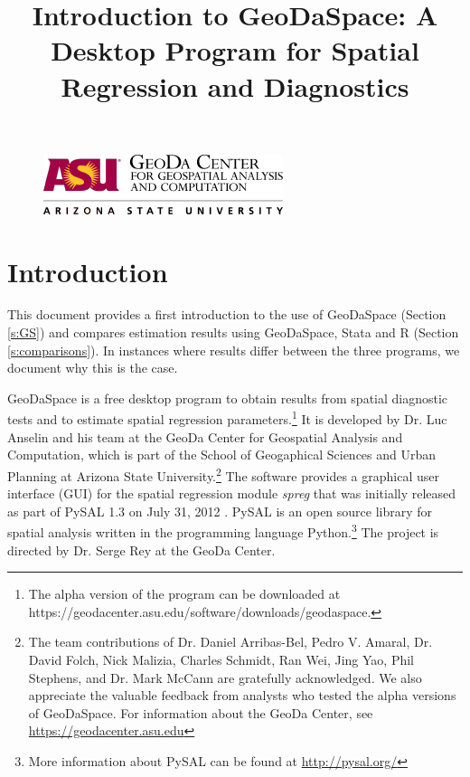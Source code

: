 \documentclass{article}
\title{Introduction to GeoDaSpace: A Desktop Program for Spatial Regression and Diagnostics}
\author{}
\begin{document}
\maketitle
\thispagestyle{empty}

\vfill

\begin{figure}[htb]
\begin{center}
\includegraphics[width=0.75\linewidth]{GeodaLogo.png}\\
\end{center}
\end{figure}


\clearpage
\pagestyle{plain}

\setcounter{secnumdepth}{3} 
\setcounter{tocdepth}{2}   

\renewcommand\contentsname{Table of Contents}
\tableofcontents

\newpage



\section{Introduction}
\label{s:intro}

This document provides a first introduction to the use of GeoDaSpace (Section \ref{s:GS}) and compares estimation results using GeoDaSpace, Stata and R (Section \ref{s:comparisons}). In instances where results differ between the three programs, we document why this is the case.

GeoDaSpace is a free desktop program to obtain results from spatial diagnostic tests and to estimate spatial regression parameters.\footnote{The alpha version of the program can be downloaded at https://geodacenter.asu.edu/software/downloads/geodaspace.} It is developed by Dr. Luc Anselin and his team at the GeoDa Center for Geospatial Analysis and Computation, which is part of the School of Geogaphical Sciences and Urban Planning at Arizona State University.\footnote{The team contributions of Dr. Daniel Arribas-Bel, Pedro V. Amaral, Dr. David Folch, Nick Malizia, Charles Schmidt, Ran Wei, Jing Yao, Phil Stephens, and Dr. Mark McCann are gratefully acknowledged. We also appreciate the valuable feedback from analysts who tested the alpha versions of GeoDaSpace. For information about the GeoDa Center, see  \url{https://geodacenter.asu.edu}} The software provides a graphical user interface (GUI) for the spatial regression module \emph{spreg} that was initially released as part of PySAL 1.3 on July 31, 2012 \citep{Rey07}. PySAL is an open source library for spatial analysis written in the programming language Python.\footnote{More information about PySAL can be found at \url{http://pysal.org/}}  The project is directed by Dr. Serge Rey at the GeoDa Center.
\end{document}
